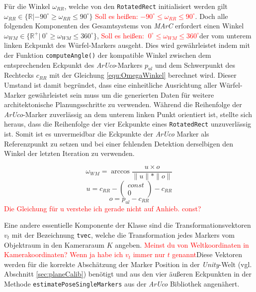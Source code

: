 Für die Winkel $\omega_{RR}$, welche von den \texttt{RotatedRect} initialisiert werden gilt $\omega_{RR} \in \{\mathbb{R} | -90^\circ \ge \omega_{RR} \le 90^\circ\}$ \textcolor{red}{Soll es heißen: $-90^\circ \le \omega_{RR} \le 90^\circ$}. Doch alle folgenden Komponenten des Gesamtsystems von \textit{MArC} erfordert einen Winkel $\omega_{WM} \in \{\mathbb{R}^+ |\ 0 ^\circ \ge \omega_{WM} \le 360^\circ\}$, \textcolor{red}{Soll es heißen: $\ 0 ^\circ \le \omega_{WM} \le 360^\circ$}der vom unterem linken Eckpunkt des Würfel-Markers ausgeht. Dies wird gewährleistet indem mit der Funktion \texttt{compute\-Angle()} der kompatible Winkel zwischen dem entsprechenden Eckpunkt des \textit{ArUco}-Markers $p_{ul}$ und dem Schwerpunkt des Rechtecks $c_{RR}$ mit der Gleichung \ref{equ:OmegaWinkel} berechnet wird. Dieser Umstand ist damit begründet, dass eine einheitliche Ausrichtung aller Würfel-Marker gewährleistet sein muss um die generierten Daten für weitere architektonische Planungsschritte zu verwenden. Während die Reihenfolge der \textit{ArUco}-Marker zuverlässig an dem unterem linken Punkt orientiert ist, stellte sich heraus, dass die Reihenfolge der vier Eckpunkte eines \texttt{RotatedRect} unzuverlässig ist. Somit ist es unvermeidbar die Eckpunkte der \textit{ ArUco} Marker als Referenzpunkt zu setzen und bei einer fehlenden Detektion derselbigen den Winkel der letzten Iteration zu verwenden. 

\begin{equation}
\label{equ:OmegaWinkel}
\omega_{WM} = \arccos \frac{u \times o}{\|u\|*\|o\|} 
\end{equation}
\begin{equation}
u = c_{RR} - \begin{pmatrix}
const\\ 0
\end{pmatrix}  -c_{RR}
\end{equation}
\begin{equation}
o=p_{ul}-c_{RR}
\end{equation}
\textcolor{red}{Die Gleichung für u verstehe ich gerade nicht auf Anhieb. const?}


Eine andere essentielle Komponente der Klasse sind die Transformationsvektoren $v_t$ mit der Bezeichnung \texttt{tvec}, welche die Transformation jedes Markers vom Objektraum in den Kameraraum $K$ angeben. \textcolor{red}{Meinst du von Weltkoordinaten in Kamerakoordinaten? Wenn ja habe ich $v_t$ immer nur $t$ genannt}Diese Vektoren werden für die korrekte Abschätzung der Marker Position in der \textit{Unity}-Welt (vgl. Abschnitt \ref{sec:planeCalib}) benötigt und aus den vier äußeren Eckpunkten in der Methode \texttt{estimatePoseSingleMarkers} aus der \textit{ArUco} Bibliothek angenähert. 

